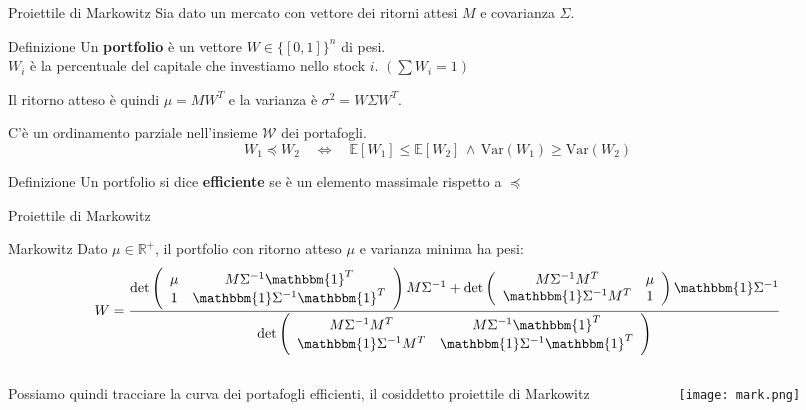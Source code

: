 \documentclass{beamer}
\newcommand{\bbR}{\mathbb{R}}
\newcommand{\1}{\mathbbm{1}}
\begin{document}
\begin{frame}{Proiettile di Markowitz}
Sia dato un mercato con vettore dei ritorni attesi $M$ e covarianza $\Sigma$.
\vspace{10pt}

\begin{block}{Definizione}
Un \textbf{portfolio} è un vettore $W\in \{[0,1]\}^n$ di pesi.\\
$W_i$ è la percentuale del capitale che investiamo nello stock $i$. $\left( \sum W_i = 1 \right) $
\end{block}
Il ritorno atteso è quindi $\mu=MW^T$ e la varianza è $\sigma^2=W\Sigma W^T$.\\
\vspace{20pt}

C'è un ordinamento parziale nell'insieme $\mathcal{W}$ dei portafogli.
\[
W_1\preceq W_2 \quad\Leftrightarrow\quad \mathbb{E}[W_1]\leq\mathbb{E}[W_2] \,\wedge\, \text{Var}(W_1)\geq\text{Var}(W_2)
\]
\vspace{-15pt}
\begin{block}{Definizione}
Un portfolio si dice \textbf{efficiente} se è un elemento massimale rispetto a $\preceq$
\end{block}
\end{frame}

\begin{frame}{Proiettile di Markowitz}
\begin{block}{Markowitz}
Dato $\mu\in\bbR^+$, il portfolio con ritorno atteso $\mu$ e varianza minima ha pesi:
\[
W=
\frac{
\det\left(
	\begin{array}{cc}
		\mu & M\Sigma^{-1}\mathbbm{1}^T\\
		1   & \mathbbm{1}\Sigma^{-1}\mathbbm{1}^T
	\end{array}
\right)M\Sigma^{-1}
+
\det\left(
	\begin{array}{cc}
		M\Sigma^{-1}M^T     &  \mu\\
		\mathbbm{1}\Sigma^{-1}M^T  & 1
	\end{array}
\right)\mathbbm{1}\Sigma^{-1}
}
{
\det\left(
	\begin{array}{cc}
		M\Sigma^{-1}M^T  &  M\Sigma^{-1}\mathbbm{1}^T\\
		\mathbbm{1}\Sigma^{-1}M^T  &  \mathbbm{1}\Sigma^{-1}\mathbbm{1}^T
	\end{array}
\right)
}
\]
\end{block}
\vspace{10pt}

\begin{columns}
\begin{column}{0.5 \textwidth}
Possiamo quindi tracciare la curva dei portafogli efficienti, il cosiddetto proiettile di Markowitz
\end{column}
\begin{column}{0.5 \textwidth}
\texttt{[image: mark.png]}
\end{column}
\end{columns}
\end{frame}
\end{document}
